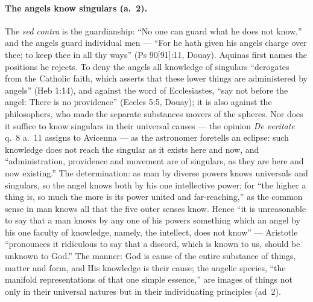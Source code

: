 \paragraph{The angels know singulars (a.~2).} The \emph{sed contra} is the
guardianship: ``No one can guard what he does not know,'' and the angels
guard individual men --- ``For he hath given his angels charge over thee;
to keep thee in all thy ways'' (Ps 90[91]:11, Douay). Aquinas first names
the positions he rejects. To deny the angels all knowledge of singulars
``derogates from the Catholic faith, which asserts that these lower things
are administered by angels'' (Heb 1:14), and against the word of
Ecclesiastes, ``say not before the angel: There is no providence''
(Eccles 5:5, Douay); it is also against the philosophers, who made the
separate substances movers of the spheres. Nor does it suffice to know
singulars in their universal causes --- the opinion \emph{De veritate}
q.~8 a.~11 assigns to Avicenna --- as the astronomer foretells an eclipse:
such knowledge does not reach the singular as it exists here and now, and
``administration, providence and movement are of singulars, as they are
here and now existing.'' The determination: as man by diverse powers knows
universals and singulars, so the angel knows both by his one intellective
power; for ``the higher a thing is, so much the more is its power united
and far-reaching,'' as the common sense in man knows all that the five
outer senses know. Hence ``it is unreasonable to say that a man knows by
any one of his powers something which an angel by his one faculty of
knowledge, namely, the intellect, does not know'' --- Aristotle ``pronounces
it ridiculous to say that a discord, which is known to us, should be
unknown to God.'' The manner: God is cause of the entire substance of
things, matter and form, and His knowledge is their cause; the angelic
species, ``the manifold representations of that one simple essence,'' are
images of things not only in their universal natures but in their
individuating principles (ad~2).

